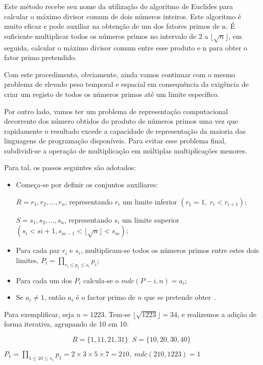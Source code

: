 Este método recebe seu nome da utilização do algoritmo de Euclides para calcular o máximo divisor comum de dois números inteiros. Este algoritmo é muito eficaz e pode auxiliar na obtenção de um dos fatores primos de n. É suficiente multiplicar todos os números primos no intervalo de 2 a  $\lfloor \sqrt{n} \rfloor$, em seguida, calcular o máximo divisor comum entre esse produto e n para obter o fator primo pretendido.

Com este procedimento, obviamente, ainda vamos continuar com o mesmo problema de elevado peso temporal e espacial em consequência  da exigência de criar um registo de todos os números primos até um limite específico.

Por outro lado, vamos ter um problema de representação computacional decorrente dos número obtidos do produto de números primos uma vez que rapidamente o resultado excede a capacidade de representação da maioria das linguagens de programação disponíveis.
Para evitar esse problema final,  subdividi-se a operação de multiplicação em múltiplas multiplicações menores.

Para tal, os passos seguintes são adotados:

\begin{itemize}[itemsep=0pt]
    \item Começa-se por definir os conjuntos auxiliares:

    $R={r_1,r_2,\dots,r_n}$, representando $r_i$ um limite inferior $(r_1=1,\;r_i<r_{i+1});$
    
    $S={s_1,s_2,\dots,s_n}$, representando $s_i$ um limite superior$(s_i<s{i+1},s_{m-1}<\lfloor \sqrt{n} \rfloor<s_m)$;
    \item Para cada par $r_i$ e $s_i$, multiplicam-se todos os números primos entre estes dois limites, $P_i=\prod_{r_i\leq p_i \leq s_i}p_i$;
    \item Para cada um dos $P_i$ calcula-se o $mdc(P-i,n)=a_i$;
    \item Se $a_i \neq 1 $, então $a_i$ é o factor primo de $n$ que se pretende obter~\cite{Quaresma2009a}.
\end{itemize}

Para exemplificar, seja $n=1223$. Tem-se $\lfloor \sqrt{1223} \rfloor =34$, e realizemos a adição de forma iterativa, agrupando de 10 em 10.

$$R=\{1,11,21,31\} \; \; S=\{10,20,30,40\}$$

 $P_1=\prod_{1\leq 10 \leq s_1}p_1=2\times 3 \times 5 \times 7=210,\;mdc(210,1223)=1$
 
